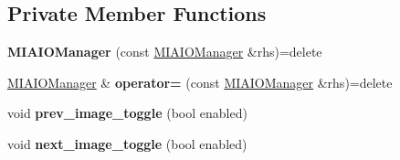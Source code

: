 \subsection*{Private Member Functions}
\begin{DoxyCompactItemize}
\item 
{\bfseries M\+I\+A\+I\+O\+Manager} (const \hyperlink{classimage__tools_1_1MIAIOManager}{M\+I\+A\+I\+O\+Manager} \&rhs)=delete\hypertarget{classimage__tools_1_1MIAIOManager_a4705d1544a60d8275803487ec9b17be8}{}\label{classimage__tools_1_1MIAIOManager_a4705d1544a60d8275803487ec9b17be8}

\item 
\hyperlink{classimage__tools_1_1MIAIOManager}{M\+I\+A\+I\+O\+Manager} \& {\bfseries operator=} (const \hyperlink{classimage__tools_1_1MIAIOManager}{M\+I\+A\+I\+O\+Manager} \&rhs)=delete\hypertarget{classimage__tools_1_1MIAIOManager_a9ab2095006589dda25bbf2a8d1aca39e}{}\label{classimage__tools_1_1MIAIOManager_a9ab2095006589dda25bbf2a8d1aca39e}

\item 
void {\bfseries prev\+\_\+image\+\_\+toggle} (bool enabled)\hypertarget{classimage__tools_1_1MIAIOManager_a87cd4108946bdf57ad6f2eedd545e30c}{}\label{classimage__tools_1_1MIAIOManager_a87cd4108946bdf57ad6f2eedd545e30c}

\item 
void {\bfseries next\+\_\+image\+\_\+toggle} (bool enabled)\hypertarget{classimage__tools_1_1MIAIOManager_a2b1effd6e28593276280f8665cd6c6b3}{}\label{classimage__tools_1_1MIAIOManager_a2b1effd6e28593276280f8665cd6c6b3}

\end{DoxyCompactItemize}
